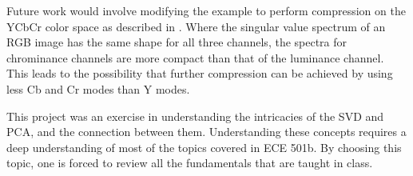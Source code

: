 \documentclass[conference]{IEEEtran}
\begin{document}
    Future work would involve modifying the example to perform compression on the YCbCr color space as described in \cite{xu_color_conversion}. Where the singular value spectrum of an RGB image has the same shape for all three channels, the spectra for chrominance channels are more compact than that of the luminance channel. This leads to the possibility that further compression can be achieved by using less Cb and Cr modes than Y modes.

    This project was an exercise in understanding the intricacies of the SVD and PCA, and the connection between them. Understanding these concepts requires a deep understanding of most of the topics covered in ECE 501b. By choosing this topic, one is forced to review all the fundamentals that are taught in class.


    \nocite{jaradet_svd_image_compression}
    \nocite{shlens_2014_tutorial}
    \nocite{omar_image_compression}
    \nocite{xu_color_conversion}
    {}
    
\end{document}
